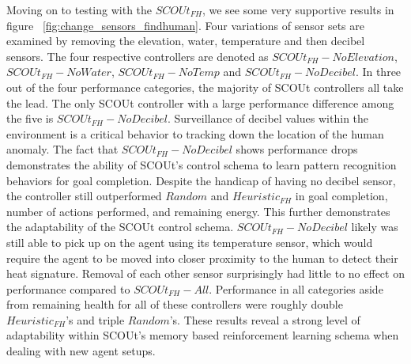 Moving on to testing with the $SCOUt_{FH}$, we see some very supportive results in figure ~\ref{fig:change_sensors_findhuman}.
Four variations of sensor sets are examined by removing the elevation, water, temperature and then decibel sensors.
The four respective controllers are denoted as $SCOUt_{FH} - No Elevation$, $SCOUt_{FH} - No Water$, $SCOUt_{FH} - No Temp$ and $SCOUt_{FH} - No Decibel$.
In three out of the four performance categories, the majority of SCOUt controllers all take the lead.
The only SCOUt controller with a large performance difference among the five is $SCOUt_{FH} - No Decibel$.
Surveillance of decibel values within the environment is a critical behavior to tracking down the location of the human anomaly.
The fact that $SCOUt_{FH} - No Decibel$ shows performance drops demonstrates the ability of SCOUt's control schema to learn pattern recognition behaviors for goal completion.
Despite the handicap of having no decibel sensor, the controller still outperformed $Random$ and $Heuristic_{FH}$ in goal completion, number of actions performed, and remaining energy.
This further demonstrates the adaptability of the SCOUt control schema.
$SCOUt_{FH} - No Decibel$ likely was still able to pick up on the agent using its temperature sensor, which would require the agent to be moved into closer proximity to the human to detect their heat signature.
Removal of each other sensor surprisingly had little to no effect on performance compared to $SCOUt_{FH} - All$.
Performance in all categories aside from remaining health for all of these controllers were roughly double $Heuristic_{FH}$'s and triple $Random$'s.
These results reveal a strong level of adaptability within SCOUt's memory based reinforcement learning schema when dealing with new agent setups.

